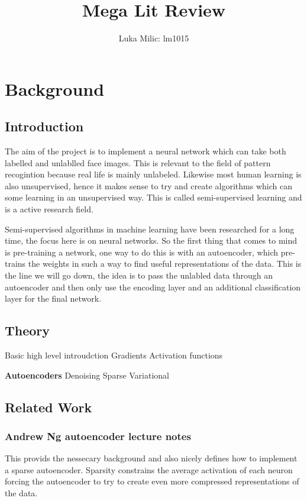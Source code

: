 \documentclass[11pt]{article} \usepackage{amsmath, amsthm, amssymb}
\title{Mega Lit Review} \author{Luka Milic: lm1015}
\begin{document}
\maketitle
%
%
%
\section{Background}
\subsection{Introduction}
The aim of the project is to implement a
neural network which can take both labelled and unlablled face images.
\cite{tensorflow} This is relevant to the field of pattern
recogintion because real life is mainly unlabeled. Likewise most human
learning is also unsupervised\cite{Rocki2016}, hence it makes sense to try and create algorithms
which can some learning in an unsupervised way. This is called semi-supervised learning and is a active research field.

Semi-supervised algorithms in machine learning have been researched for a long
time, the focus here is on neural networks. So the first thing that comes to mind
is pre-training a network, one way to do this is with an autoencoder, which
pre-trains the weights in such a way to find useful representations of the data.
This is the line we will go down, the idea is to pass the unlabled data through
an autoencoder and then only use the encoding layer and an additional classification
layer for the final network.
%
%
%
\subsection{Theory}
Basic high level introudction
Gradients
Activation functions

{\bf Autoencoders}
Denoising
\newline Sparse
\newline Variational

%
%
%
\subsection{Related Work}
\subsubsection*{Andrew Ng autoencoder lecture notes}
This provids the nessecary background and also nicely
defines how to implement a sparse autoencoder. Sparsity constrains the average
activation of each neuron forcing the autoencoder to try to create even more
compressed representations of the data.
\end{document}
